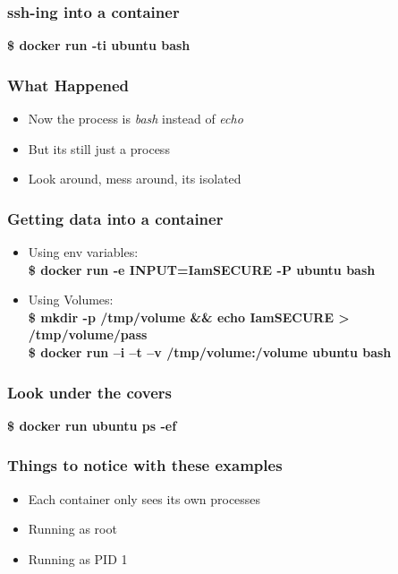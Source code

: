\documentclass[aspectratio=169,11pt,hyperref={colorlinks=true}]{beamer}
\begin{document}
\begin{frame}
    \frametitle{ssh-ing into a container}
    {\LARGE \textbf{\$ docker run -ti ubuntu bash}}
\end{frame}

\begin{frame}
    \frametitle{What Happened}
    \begin{itemize}
        \item Now the process is \textit{bash} instead of \textit{echo}
        \item But its still just a process
        \item Look around, mess around, its isolated
    \end{itemize}
\end{frame}

\begin{frame}
    \frametitle{Getting data into a container}
    \begin{itemize}
        \item Using env variables: \\
           \textbf{\$ docker run -e INPUT=IamSECURE -P ubuntu bash}
       \item Using Volumes: \\
           \textbf{\$ mkdir -p /tmp/volume \&\& echo IamSECURE > /tmp/volume/pass}\\
           \textbf{\$ docker run –i –t –v /tmp/volume:/volume ubuntu bash}
    \end{itemize}
\end{frame}

\begin{frame}
    \frametitle{Look under the covers}
    {\LARGE \textbf{\$ docker run ubuntu ps -ef}}
\end{frame}

\begin{frame}
    \frametitle{Things to notice with these examples}
    \begin{itemize}
        \item Each container only sees its own processes
        \item Running as root
        \item Running as PID 1
    \end{itemize}
\end{frame}
\end{document}
